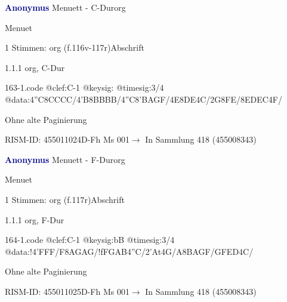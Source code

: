 \documentclass[twocolumn, 12pt]{book}
\begin{document}
\par \vspace{16pt} \textcolor{darkblue}{\textbf{Anonymus  }}\hfillplus{\textbf{[163]}}\newline Menuett - C-Dur\newline org
\par \begin{itshape}[f.116v, heading:] Menuet\end{itshape} 
\par \textcolor{darkblue}{}  1 Stimmen: org  (f.116v-117r)\newline Abschrift
\par 1.1.1  org, C-Dur  
\begin{filecontents*}{163-1.code}
@clef:C-1
@keysig:
@timesig:3/4
@data:4''C{8CCCC}/4'B{8BBBB}/4''C{8'BAGF}/4E{8DE}4C/2G{8FE}/{8EDEC}4F/
\end{filecontents*}
\newline %
\par Ohne alte Paginierung
\par RISM-ID: 455011024\newline D-Fh  Ms 001\newline $\rightarrow$ In Sammlung 418 (455008343)
      
\par \vspace{16pt} \textcolor{darkblue}{\textbf{Anonymus  }}\hfillplus{\textbf{[164]}}\newline Menuett - F-Dur\newline org
\par \begin{itshape}[f.117r, heading:] Menuet\end{itshape} 
\par \textcolor{darkblue}{}  1 Stimmen: org  (f.117r)\newline Abschrift
\par 1.1.1  org, F-Dur  
\begin{filecontents*}{164-1.code}
@clef:C-1
@keysig:bB
@timesig:3/4
@data:!4'FFF/F{8AGAG}/!f{FGAB}4''C/2'At4G/A{8BAGF}/{GFED}4C/
\end{filecontents*}
\newline %
\par Ohne alte Paginierung
\par RISM-ID: 455011025\newline D-Fh  Ms 001\newline $\rightarrow$ In Sammlung 418 (455008343)
      
\end{document}
